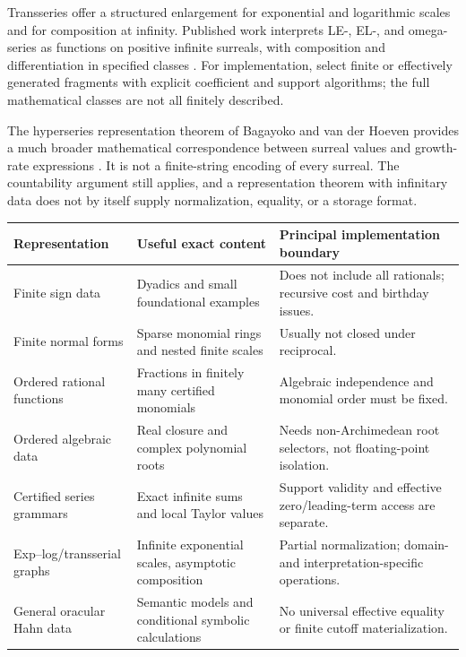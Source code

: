 \documentclass[11pt,letterpaper]{article}
\theoremstyle{definition}
\numberwithin{equation}{section}
\begin{document}
Transseries offer a structured enlargement for exponential and logarithmic scales and for composition at infinity. Published work interprets LE-, EL-, and omega-series as functions on positive infinite surreals, with composition and differentiation in specified classes \cite{BMFunctions}. For implementation, select finite or effectively generated fragments with explicit coefficient and support algorithms; the full mathematical classes are not all finitely described.

The hyperseries representation theorem of Bagayoko and van der Hoeven provides a much broader mathematical correspondence between surreal values and growth-rate expressions \cite{Hyperseries}. It is not a finite-string encoding of every surreal. The countability argument still applies, and a representation theorem with infinitary data does not by itself supply normalization, equality, or a storage format.

\begin{center}\small
\begin{longtable}{@{}L{0.22\textwidth}L{0.34\textwidth}L{0.35\textwidth}@{}}
\toprule
Representation & Useful exact content & Principal implementation boundary\\\midrule\endhead
Finite sign data & Dyadics and small foundational examples & Does not include all rationals; recursive cost and birthday issues.\\[0.35em]
Finite normal forms & Sparse monomial rings and nested finite scales & Usually not closed under reciprocal.\\[0.35em]
Ordered rational functions & Fractions in finitely many certified monomials & Algebraic independence and monomial order must be fixed.\\[0.35em]
Ordered algebraic data & Real closure and complex polynomial roots & Needs non-Archimedean root selectors, not floating-point isolation.\\[0.35em]
Certified series grammars & Exact infinite sums and local Taylor values & Support validity and effective zero/leading-term access are separate.\\[0.35em]
Exp--log/transserial graphs & Infinite exponential scales, asymptotic composition & Partial normalization; domain- and interpretation-specific operations.\\[0.35em]
General oracular Hahn data & Semantic models and conditional symbolic calculations & No universal effective equality or finite cutoff materialization.\\
\bottomrule
\end{longtable}
\end{center}
\end{document}
